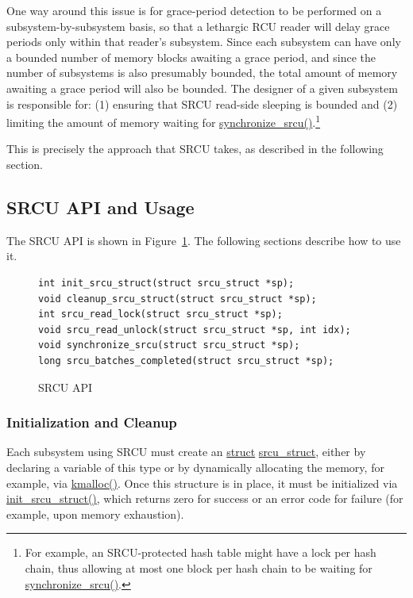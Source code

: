 One way around this issue is for grace-period detection to be performed
on a subsystem-by-subsystem basis, so that a lethargic RCU reader will
delay grace periods only within that reader's subsystem.
Since each subsystem can have only a bounded number of memory blocks
awaiting a grace period, and since the number of subsystems is also
presumably bounded, the total amount of memory awaiting a grace period
will also be bounded.
The designer of a given subsystem is responsible for: (1) ensuring that
SRCU read-side sleeping is bounded and (2) limiting the amount of memory
waiting for \url{synchronize_srcu()}.\footnote{
	For example, an SRCU-protected hash table might have a lock
	per hash chain, thus allowing at most one block per hash
	chain to be waiting for \url{synchronize_srcu()}.}

This is precisely the approach that SRCU takes, as described in the
following section.

\subsection{SRCU API and Usage}
\label{sec:app:rcuimpl:SRCU API and Usage}

The SRCU API is shown in Figure~\ref{fig:app:rcuimpl:SRCU API}.
The following sections describe how to use it.

\begin{figure}[htbp]
{ \scriptsize
\begin{verbatim}
int init_srcu_struct(struct srcu_struct *sp);
void cleanup_srcu_struct(struct srcu_struct *sp);
int srcu_read_lock(struct srcu_struct *sp);
void srcu_read_unlock(struct srcu_struct *sp, int idx);
void synchronize_srcu(struct srcu_struct *sp);
long srcu_batches_completed(struct srcu_struct *sp);
\end{verbatim}
}
\caption{SRCU API}
\label{fig:app:rcuimpl:SRCU API}
\end{figure}

\subsubsection{Initialization and Cleanup}
\label{sec:app:rcuimpl:Initialization and Cleanup}

Each subsystem using SRCU must create an
\url{struct} \url{srcu_struct},
either by declaring a variable of this type or by
dynamically allocating the memory, for example, via \url{kmalloc()}.
Once this structure is in place, it must be initialized via
\url{init_srcu_struct()}, which returns zero for success or an error
code for failure (for example, upon memory exhaustion).

